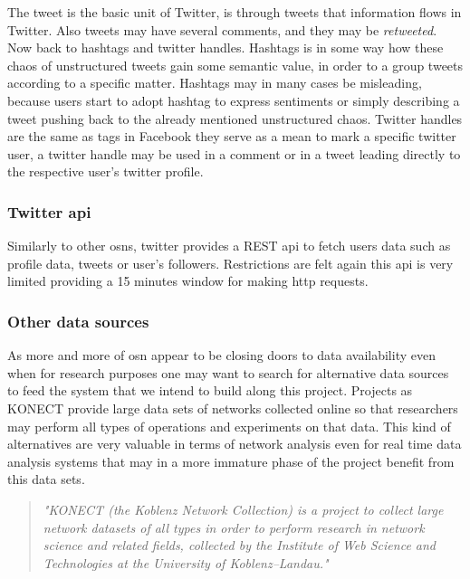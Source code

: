 \indent The tweet is the basic unit of Twitter, is through tweets that information flows in Twitter. Also tweets may have several comments, and they may
be \textit{retweeted}. Now back to hashtags and twitter handles. Hashtags is in some way how these chaos of unstructured tweets gain some semantic
value, in order to a group tweets according to a specific matter. Hashtags may in many cases be misleading, because users
start to adopt hashtag to express sentiments or simply describing a tweet pushing back to the already mentioned unstructured chaos.
Twitter handles are the same as tags in Facebook they serve as a mean to mark a specific twitter user, a twitter handle may be used in a comment or
in a tweet leading directly to the respective user's twitter profile.

\subsubsection*{Twitter \gls{api}}
Similarly to other \glspl{osn}, twitter provides a REST \gls{api} to fetch users data such as profile data, tweets or user's followers. Restrictions are felt
again this \gls{api} is very limited providing a 15 minutes window for making http requests.

\subsubsection*{Other data sources}
\label{sec:otherdatasources}
As more and more of \gls{osn} appear to be closing doors to data availability even when for research purposes one may
want to search for alternative data sources to feed the system that we intend to build along this project. Projects as
KONECT \citep{kunegis2013konect} provide large data sets of networks collected online so that researchers may
perform all types of operations and experiments on that data. This kind of alternatives are very valuable in terms of network
analysis even for real time data analysis systems that may in a more immature phase of the project benefit from this data sets.

\begin{quote}
\textit{"KONECT (the Koblenz Network Collection) is a project to collect large network datasets of all
types in order to perform research in network science and related fields, collected by the Institute
of Web Science and Technologies at the University of Koblenz–Landau."} \citep{kunegis2013konect}
\end{quote}

